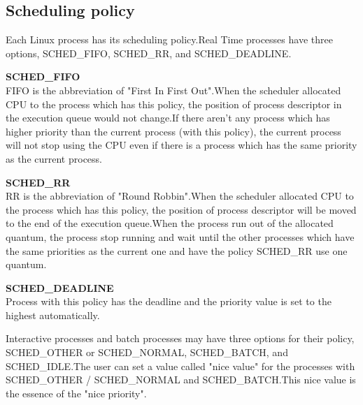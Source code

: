 \documentclass[10pt,a4paper]{ltjsarticle}       %
\begin{document}
\subsection{Scheduling policy}
Each Linux process has its scheduling policy.Real Time processes have three options, SCHED\_FIFO, SCHED\_RR, and SCHED\_DEADLINE.
\begin{description}
\item {\bf SCHED\_FIFO}\\
FIFO is the abbreviation of "First In First Out".When the scheduler allocated CPU to the process which has this policy, the position of process descriptor in the execution queue would not change.If there aren't any process which has higher priority than the current process (with this policy), the current process will not stop using the CPU even if there is a process which has the same priority as the current process.
\item {\bf SCHED\_RR} \\
RR is the abbreviation of "Round Robbin".When the scheduler allocated CPU to the process which has this policy, the position of process descriptor will be moved to the end of the execution queue.When the process run out of the allocated quantum, the process stop running and wait until the other processes which have the same priorities as the current one and have the policy SCHED\_RR use one quantum.
\item {\bf SCHED\_DEADLINE}\\
Process with this policy has the deadline and the priority value is set to the highest automatically.
\end{description}
Interactive processes and batch processes may have three options for their policy, SCHED\_OTHER or SCHED\_NORMAL, SCHED\_BATCH, and SCHED\_IDLE.The user can set a value called "nice value" for the processes with SCHED\_OTHER / SCHED\_NORMAL and SCHED\_BATCH.This nice value is the essence of the "nice priority".
\end{document}
